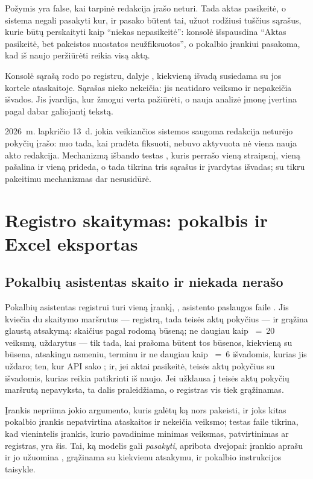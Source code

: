 Požymis  yra false, kai tarpinė redakcija įrašo neturi. Tada aktas pasikeitė, o
sistema negali pasakyti kur, ir pasako būtent tai, užuot rodžiusi tuščius sąrašus, kurie būtų
perskaityti kaip \enquote{niekas nepasikeitė}: konsolė išspausdina \enquote{Aktas pasikeitė, bet
pakeistos nuostatos neužfiksuotos}, o pokalbio įrankiui pasakoma, kad iš naujo peržiūrėti reikia
visą aktą.

Konsolė sąrašą rodo po registru, dalyje , kiekvieną išvadą susiedama
su jos kortele ataskaitoje. Sąrašas nieko nekeičia: jis neatidaro veiksmo ir nepakeičia išvados.
Jis įvardija, kur žmogui verta pažiūrėti, o nauja analizė įmonę įvertina pagal dabar galiojantį
tekstą.

2026~m. lapkričio 13~d. jokia veikiančios sistemos saugoma redakcija neturėjo pokyčių įrašo: nuo
tada, kai pradėta fiksuoti, nebuvo aktyvuota nė viena nauja akto redakcija. Mechanizmą išbando
testas , kuris
perrašo vieną straipsnį, vieną pašalina ir vieną prideda, o tada tikrina tris sąrašus ir
įvardytas išvadas; su tikru pakeitimu mechanizmas dar nesusidūrė.


\section{Registro skaitymas: pokalbis ir Excel eksportas}\label{sec:register:reading}

\subsection{Pokalbių asistentas skaito ir niekada nerašo}

Pokalbių asistentas registrui turi vieną įrankį, , asistento paslaugos
faile . Jis kviečia du skaitymo maršrutus --- registrą, tada teisės
aktų pokyčius --- ir grąžina glaustą atsakymą: skaičius pagal rodomą būseną; ne daugiau kaip
~=~20 veiksmų, uždarytus --- tik tada, kai prašoma būtent tos būsenos,
kiekvieną su būsena, atsakingu asmeniu, terminu ir ne daugiau kaip ~=~6
išvadomis, kurias jis uždaro;  ten, kur API sako ; ir,
jei aktai pasikeitė, teisės aktų pokyčius su išvadomis, kurias reikia patikrinti iš naujo. Jei
užklausa į teisės aktų pokyčių maršrutą nepavyksta, ta dalis praleidžiama, o registras vis tiek grąžinamas.

Įrankis nepriima jokio argumento, kuris galėtų ką nors pakeisti, ir joks kitas pokalbio įrankis
nepatvirtina ataskaitos ir nekeičia veiksmo; testas faile 
tikrina, kad vienintelis įrankis, kurio pavadinime minimas veiksmas, patvirtinimas ar registras,
yra šis. Tai, ką modelis gali \emph{pasakyti}, apribota dvejopai: įrankio aprašu ir jo
užuomina , grąžinama su kiekvienu atsakymu, ir pokalbio instrukcijos taisykle.

